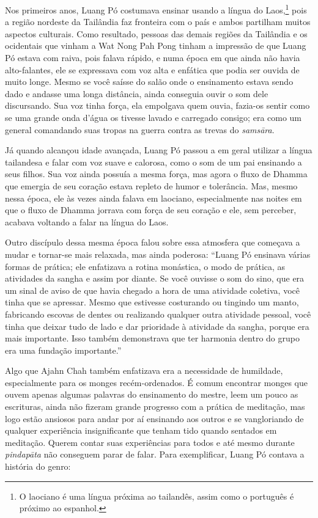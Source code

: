 Nos primeiros anos, Luang Pó costumava ensinar usando a língua do
Laos,\footnote{O laociano é uma língua próxima ao tailandês, assim como o
  português é próximo ao espanhol.} pois a região nordeste da Tailândia
faz fronteira com o país e ambos partilham muitos aspectos culturais.
Como resultado, pessoas das demais regiões da Tailândia e os ocidentais
que vinham a Wat Nong Pah Pong tinham a impressão de que Luang Pó estava
com raiva, pois falava rápido, e numa época em que ainda não havia
alto-falantes, ele se expressava com voz alta e enfática que podia ser
ouvida de muito longe. Mesmo se você saísse do salão onde o ensinamento
estava sendo dado e andasse uma longa distância, ainda conseguia ouvir o
som dele discursando. Sua voz tinha força, ela empolgava quem ouvia,
fazia-os sentir como se uma grande onda d'água os tivesse lavado e
carregado consigo; era como um general comandando suas tropas na guerra
contra as trevas do \emph{samsāra}.

Já quando alcançou idade avançada, Luang Pó passou a em geral utilizar a
língua tailandesa e falar com voz suave e calorosa, como o som de um pai
ensinando a seus filhos. Sua voz ainda possuía a mesma força, mas agora
o fluxo de Dhamma que emergia de seu coração estava repleto de humor e
tolerância. Mas, mesmo nessa época, ele às vezes ainda falava em
laociano, especialmente nas noites em que o fluxo de Dhamma jorrava com
força de seu coração e ele, sem perceber, acabava voltando a falar na
língua do Laos.

Outro discípulo dessa mesma época falou sobre essa atmosfera que
começava a mudar e tornar-se mais relaxada, mas ainda poderosa: ``Luang
Pó ensinava várias formas de prática; ele enfatizava a rotina monástica,
o modo de prática, as atividades da sangha e assim por diante. Se você
ouvisse o som do sino, que era um sinal de aviso de que havia chegado a
hora de uma atividade coletiva, você tinha que se apressar. Mesmo que
estivesse costurando ou tingindo um manto, fabricando escovas de dentes
ou realizando qualquer outra atividade pessoal, você tinha que deixar
tudo de lado e dar prioridade à atividade da sangha, porque era mais
importante. Isso também demonstrava que ter harmonia dentro do grupo era
uma fundação importante.''

Algo que Ajahn Chah também enfatizava era a necessidade de humildade,
especialmente para os monges recém-ordenados. É comum encontrar monges
que ouvem apenas algumas palavras do ensinamento do mestre, leem um
pouco as escrituras, ainda não fizeram grande progresso com a prática de
meditação, mas logo estão ansiosos para andar por aí ensinando aos
outros e se \mbox{vangloriando} de qualquer experiência insignificante que
tenham tido quando sentados em meditação. Querem contar suas
experiências para todos e até mesmo durante \emph{pindapāta} não
conseguem parar de falar. Para exemplificar, Luang Pó contava a história
do genro:

